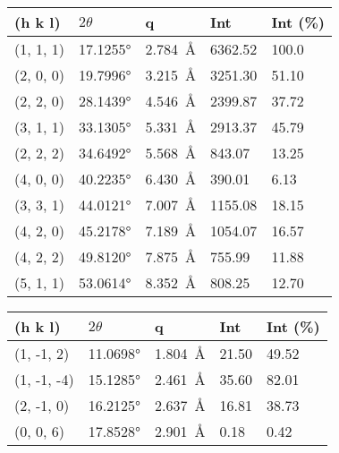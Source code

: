 \begin{table}[htb!]
    \begin{minipage}{.45\linewidth}
        \centering
        \begin{tabular}{@{}lllll@{}}
        \toprule
        (h k l) & $2\theta$ & q & Int & Int (\%) \\
        \midrule
        (1, 1, 1) & \ang{17.1255} & \qty{2.784}{\angstrom} & \num{6362.52}  & \num{100.0} \\
        (2, 0, 0) & \ang{19.7996} & \qty{3.215}{\angstrom} & \num{3251.30}  & \num{51.10} \\
        (2, 2, 0) & \ang{28.1439} & \qty{4.546}{\angstrom} & \num{2399.87}  & \num{37.72} \\
        (3, 1, 1) & \ang{33.1305} & \qty{5.331}{\angstrom} & \num{2913.37}  & \num{45.79} \\
        (2, 2, 2) & \ang{34.6492} & \qty{5.568}{\angstrom} & \num{843.07}   & \num{13.25} \\
        (4, 0, 0) & \ang{40.2235} & \qty{6.430}{\angstrom} & \num{390.01}   & \num{6.13}  \\
        (3, 3, 1) & \ang{44.0121} & \qty{7.007}{\angstrom} & \num{1155.08}  & \num{18.15} \\
        (4, 2, 0) & \ang{45.2178} & \qty{7.189}{\angstrom} & \num{1054.07}  & \num{16.57} \\
        (4, 2, 2) & \ang{49.8120} & \qty{7.875}{\angstrom} & \num{755.99}   & \num{11.88} \\
        (5, 1, 1) & \ang{53.0614} & \qty{8.352}{\angstrom} & \num{808.25}   & \num{12.70} \\
        \bottomrule
        \end{tabular}%
    \end{minipage}%
    \hfill
    \begin{minipage}{.45\linewidth}
        \centering
        \begin{tabular}{@{}lllll@{}}
        \toprule
        (h k l) & $2\theta$ & q & Int & Int (\%) \\
        \midrule
        (1, -1, 2)   & \ang{11.0698} & \qty{1.804}{\angstrom} & \num{21.50} & \num{49.52} \\
        (1, -1, -4)  & \ang{15.1285} & \qty{2.461}{\angstrom} & \num{35.60} & \num{82.01} \\
        (2, -1, 0)   & \ang{16.2125} & \qty{2.637}{\angstrom} & \num{16.81} & \num{38.73} \\
        (0, 0, 6)    & \ang{17.8528} & \qty{2.901}{\angstrom} & \num{0.18}  & \num{0.42}  \\

\end{tabular}
\end{minipage}
\end{table}
